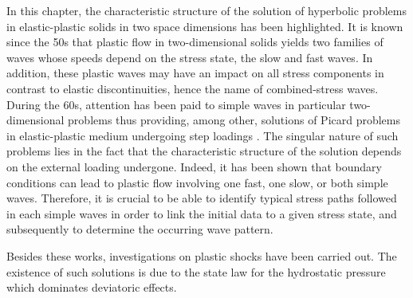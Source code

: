 In this chapter, the characteristic structure of the solution of hyperbolic problems in elastic-plastic solids in two space dimensions has been highlighted.
It is known since the 50s that plastic flow in two-dimensional solids yields two families of waves whose speeds depend on the stress state, the slow and fast waves.
In addition, these plastic waves may have an impact on all stress components in contrast to elastic discontinuities, hence the name of combined-stress waves.
During the 60s, attention has been paid to simple waves in particular two-dimensional problems thus providing, among other, solutions of Picard problems in elastic-plastic medium undergoing step loadings \cite{Clifton,Ting68,Ting73}. %
The singular nature of such problems lies in the fact that the characteristic structure of the solution depends on the external loading undergone.
Indeed, it has been shown \cite{Clifton} that boundary conditions can lead to plastic flow involving one fast, one slow, or both simple waves.
Therefore, it is crucial to be able to identify typical stress paths followed in each simple waves in order to link the initial data to a given stress state, and subsequently to determine the occurring wave pattern.

Besides these works, investigations on plastic shocks have been carried out.
The existence of such solutions is due to the state law for the hydrostatic pressure which dominates deviatoric effects.


